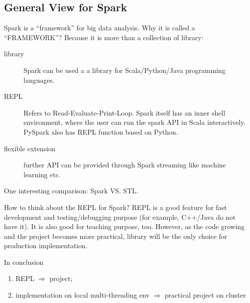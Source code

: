 \documentclass[notheorems, aspectratio=54]{beamer}
\begin{document}

\subsection{General View for Spark}
\begin{frame}

Spark is a ``framework'' for big data analysis. Why it is called a ``FRAMEWORK''? 
Because it is more than a collection of library:
\begin{description}
 \item [library] Spark can be used a a library for Scala/Python/Java programming languages.
 \item [REPL] Refers to Read-Evaluate-Print-Loop. Spark itself has an inner shell environment, 
 where the user can run the spark API in Scala interactively. PySpark also has REPL function 
 based on Python. 
 \item [flexible extension] further API can be provided through Spark streaming like
 machine learning etc.
\end{description}

One interesting comparison: Spark VS. STL.

\end{frame}

\begin{frame}


    \begin{block}{How to think about the REPL for Spark?}
    REPL is a good feature for fast development and testing/debugging purpose
    (for example, C++/Java do not have it). It is also 
    good for teaching purpose, too. However, as the code growing and the project 
    becomes more practical, library will be the only 
    choice for production implementation.     
    \end{block}
    
    In conclusion
   \begin{enumerate}
    \item  REPL $\Longrightarrow$ project;
    \item  implementation on local multi-threading env $\Longrightarrow$ practical project on cluster
   \end{enumerate}
      
\end{frame}
\end{document}
